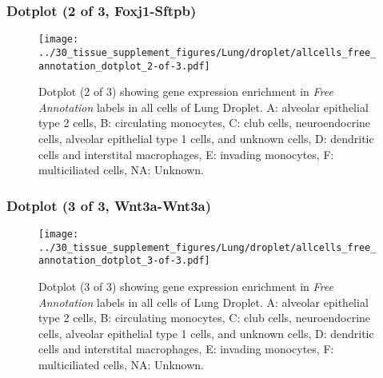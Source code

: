 \clearpage

\subsubsection{Dotplot (2 of 3, Foxj1-Sftpb)}
\begin{figure}[h]
\centering
\texttt{[image: ../30\_tissue\_supplement\_figures/Lung/droplet/allcells\_free\_annotation\_dotplot\_2-of-3.pdf]}

\caption{ Dotplot (2 of 3)  showing gene expression enrichment in \emph{Free Annotation} labels in all cells of Lung Droplet. A: alveolar epithelial type 2 cells, B: circulating monocytes, C: club cells, neuroendocrine cells, alveolar epithelial type 1 cells, and unknown cells, D: dendritic cells and interstital macrophages, E: invading monocytes, F: multiciliated cells, NA: Unknown.}
\end{figure}


\clearpage

\subsubsection{Dotplot (3 of 3, Wnt3a-Wnt3a)}
\begin{figure}[h]
\centering
\texttt{[image: ../30\_tissue\_supplement\_figures/Lung/droplet/allcells\_free\_annotation\_dotplot\_3-of-3.pdf]}

\caption{ Dotplot (3 of 3)  showing gene expression enrichment in \emph{Free Annotation} labels in all cells of Lung Droplet. A: alveolar epithelial type 2 cells, B: circulating monocytes, C: club cells, neuroendocrine cells, alveolar epithelial type 1 cells, and unknown cells, D: dendritic cells and interstital macrophages, E: invading monocytes, F: multiciliated cells, NA: Unknown.}
\end{figure}

